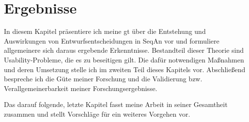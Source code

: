 \glsresetall
\chapter{Ergebnisse}
\label{sec:Ergebnisse}

In diesem Kapitel präsentiere ich meine \gls{gt} über die Entstehung und Auswirkungen von Entwurfsentscheidungen in SeqAn vor und formuliere allgemeinere sich daraus ergebende Erkenntnisse. Bestandteil dieser Theorie sind Usability-Probleme, die es zu beseitigen gilt. Die dafür notwendigen Maßnahmen und deren Umsetzung stelle ich im zweiten Teil dieses Kapitels vor. Abschließend bespreche ich die Güte meiner Forschung und die Validierung bzw. Verallgemeinerbarkeit meiner Forschungsergebnisse.

Das darauf folgende, letzte Kapitel fasst meine Arbeit in seiner Gesamtheit zusammen und stellt Vorschläge für ein weiteres Vorgehen vor.

\bigskip


\begin{comment}
GT starke Ähnlichkeit mit paradigmatischem Modell. Jedoch waren Strategien nicht immer ersichtlich in den Daten. Daher Platzierung unterhalb
Theorie: Inspiriert durch das paradigmatische Modell.
Freiheiten nach Glaser



Nur Fokus auf Doku und \code{Templatemetaprogrammierung}\citepurl{apiua://code/-9223372036854775515} \code{Erwartungskonformität}\citepurl{sec:schwierigkeiten-breite}
da sonst einfach zu komplex wenn man empirische Verfahren nutzt \cite{SIGCHI:2009up}



Beim selektiven Kodieren eine ganze Menge weggefallen: z.B. \code{Langjähriger sporadischer Gebrauch}
Betroffene arbeiten nur selten mit SeqAn dafür aber seit Jahren mit SeqAn.
Die Anwender geben an, nicht erfahren/kompetent im Umgang mit SeqAn zu sein.
Ist das normal? Also auch bei anderer Software?
und
\code[apiua://code/-9223372036854775559]{Lernen / Vertiefen für Abschlussarbeit}
\end{comment}















\cleardoublepage